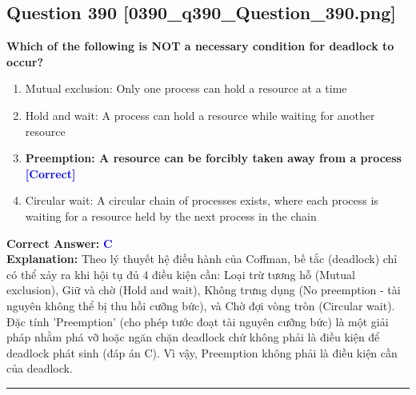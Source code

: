 \documentclass[11pt,a4paper]{article}
\begin{document}
\begin{minipage}{\textwidth}
\subsection*{Question 390 \quad \footnotesize{[0390\_q390\_Question\_390.png]}}
\noindent \textbf{Which of the following is NOT a necessary condition for deadlock to occur?}

\begin{enumerate}[label=\Alph*.]
    \item Mutual exclusion: Only one process can hold a resource at a time
    \item Hold and wait: A process can hold a resource while waiting for another resource
    \item \textbf{Preemption: A resource can be forcibly taken away from a process} \hfill \textcolor{blue}{\textbf{[Correct]}}
    \item Circular wait: A circular chain of processes exists, where each process is waiting for a resource held by the next process in the chain
\end{enumerate}

\noindent \textbf{Correct Answer:} \textcolor{blue}{\textbf{C}} \\[2pt]
\noindent \textbf{Explanation:} Theo lý thuyết hệ điều hành của Coffman, bế tắc (deadlock) chỉ có thể xảy ra khi hội tụ đủ 4 điều kiện cần: Loại trừ tương hỗ (Mutual exclusion), Giữ và chờ (Hold and wait), Không trưng dụng (No preemption - tài nguyên không thể bị thu hồi cưỡng bức), và Chờ đợi vòng tròn (Circular wait). Đặc tính 'Preemption' (cho phép tước đoạt tài nguyên cưỡng bức) là một giải pháp nhằm phá vỡ hoặc ngăn chặn deadlock chứ không phải là điều kiện để deadlock phát sinh (đáp án C). Vì vậy, Preemption không phải là điều kiện cần của deadlock.

\par\vspace{0.3cm}
\hrule
\vspace{0.3cm}
\end{minipage}
\end{document}
